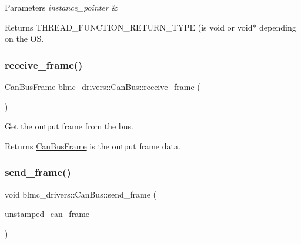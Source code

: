 \begin{DoxyParams}{Parameters}
{\em instance\+\_\+pointer} & \\
\hline
\end{DoxyParams}
\begin{DoxyReturn}{Returns}
T\+H\+R\+E\+A\+D\+\_\+\+F\+U\+N\+C\+T\+I\+O\+N\+\_\+\+R\+E\+T\+U\+R\+N\+\_\+\+T\+Y\+PE (is void or void$\ast$ depending on the OS. 
\end{DoxyReturn}
\mbox{\label{classblmc__drivers_1_1CanBus_ada25ff1dcd774666f423b23d4de664ea}} 
\subsubsection{\texorpdfstring{receive\+\_\+frame()}{receive\_frame()}}
{\footnotesize\ttfamily \hyperlink{classblmc__drivers_1_1CanBusFrame}{Can\+Bus\+Frame} blmc\+\_\+drivers\+::\+Can\+Bus\+::receive\+\_\+frame (\begin{DoxyParamCaption}{ }\end{DoxyParamCaption})\hspace{0.3cm}{\ttfamily [private]}}



Get the output frame from the bus. 

\begin{DoxyReturn}{Returns}
\hyperlink{classblmc__drivers_1_1CanBusFrame}{Can\+Bus\+Frame} is the output frame data. 
\end{DoxyReturn}
\mbox{\label{classblmc__drivers_1_1CanBus_ae445662e791d0b6149289d9df39e1ea0}} 
\subsubsection{\texorpdfstring{send\+\_\+frame()}{send\_frame()}}
{\footnotesize\ttfamily void blmc\+\_\+drivers\+::\+Can\+Bus\+::send\+\_\+frame (\begin{DoxyParamCaption}\item[{const \hyperlink{classblmc__drivers_1_1CanBusFrame}{Can\+Bus\+Frame} \&}]{unstamped\+\_\+can\+\_\+frame }\end{DoxyParamCaption})\hspace{0.3cm}{\ttfamily [private]}}



